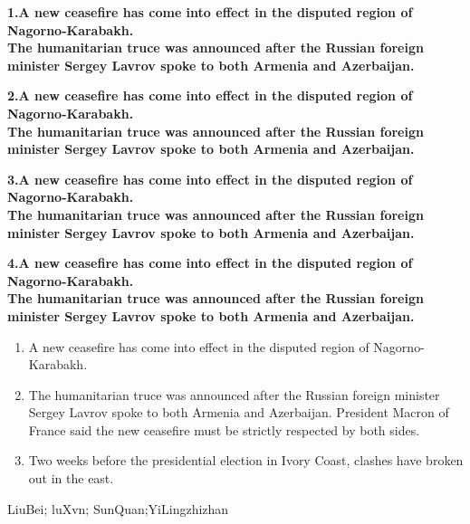 \documentclass[UTF8,12pt,twoside,a4paper]{ctexart} %
\begin{document}
\begin{titlepage}
\begin{flushleft}
{\setmainfont{Times New Roman}}
	\bfseries{}
\end{flushleft}

\bfseries{1.A new ceasefire has come into effect in the disputed region of Nagorno-Karabakh.}\\
 \mdseries The humanitarian truce was announced after the Russian foreign minister Sergey Lavrov spoke to both Armenia and Azerbaijan.

\bfseries{2.A new ceasefire has come into effect in the disputed region of Nagorno-Karabakh.}\\
 \mdseries The humanitarian truce was announced after the Russian foreign minister Sergey Lavrov spoke to both Armenia and Azerbaijan.

\bfseries{3.A new ceasefire has come into effect in the disputed region of Nagorno-Karabakh.}\\
 \mdseries The humanitarian truce was announced after the Russian foreign minister Sergey Lavrov spoke to both Armenia and Azerbaijan.

\bfseries{4.A new ceasefire has come into effect in the disputed region of Nagorno-Karabakh.}\\
 \mdseries The humanitarian truce was announced after the Russian foreign minister Sergey Lavrov spoke to both Armenia and Azerbaijan.

\begin{flushleft}
{\setmainfont{Times New Roman}}
	\bfseries{}
\end{flushleft}

\begin{enumerate}%
  \item A new ceasefire has come into effect in the disputed region of Nagorno-Karabakh. 
  \item  The humanitarian truce was announced after the Russian foreign minister Sergey Lavrov spoke to both Armenia and Azerbaijan. President Macron of France said the new ceasefire must be strictly respected by both sides.
  \item Two weeks before the presidential election in Ivory Coast, clashes have broken out in the east.
\end{enumerate}


\begin{flushleft}
{\setmainfont{Times New Roman}}
	\bfseries{}
\end{flushleft}

LiuBei; luXvn; SunQuan;YiLingzhizhan

\end{titlepage}
\end{document}
